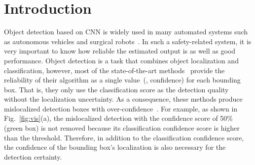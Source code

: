 \documentclass[final]{cvpr}
\begin{document}
\begin{abstract}
\begin{figure}[t]
\label{fig:gaussian}
\end{figure}




\begin{figure*}[t]
\centering
\texttt{[image: vis.pdf]} 
\caption{\textbf{ Example of over-confidence problem resolved by Gaussian-FCOS~(proposed).}
The colors of bounding boxes are chosen by its detection score (a) and certainty score (b), (c).
Specifically, the higher score (up to 1.0) is, the box color is to be red otherwise blue, where `conf\_th' denotes confidence threshold for the visualization.
`C' in (b), (c) denotes the estimated certainty score.
Gaussian-FCOS captures localization uncertainty for each bounding box which means how certain box location is.
For example, each detected person has a higher certainty score over 90\% whereas the false positive~(cyan box) due to the overlap between persons gets a lower certainty score (45\%).
Unlike FCOS~(a), Gaussian-FCOS~(c) filters out the false positive by decaying the detection score with the estimated certainty score.
compared to FCOS, Gaussian-FCOS localizes the person with a tennis racket more accurately~(tightly).
}

\label{fig:vis}
\end{figure*}




\end{abstract}

\section{Introduction}
Object detection based on CNN is widely used in many automated systems such as autonomous vehicles and surgical robots~\cite{sarikaya2017detection}.
In such a safety-related system, it is very important to know how reliable the estimated output is as well as good performance.
Object detection is a task that combines object localization and classification, however, most of the state-of-the-art methods~\cite{cai2018cascade,Tian_2019_ICCV,zhang2019bridging} provide the reliability of their algorithm as a single value~(\eg, confidence) for each bounding box.
That is, they only use the classification score as the detection quality without the localization uncertainty.
As a consequence, these methods produce mislocalized detection boxes with over-confidence~\cite{he2019bounding}.
For example, as shown in Fig.~\ref{fig:vis}(a), the mislocalized detection with the confidence score of 50\% (green box) is not removed because its classification confidence score is higher than the threshold.
Therefore, in addition to the classification confidence score, the confidence of the bounding box's localization is also necessary for the detection certainty. 
\end{document}
